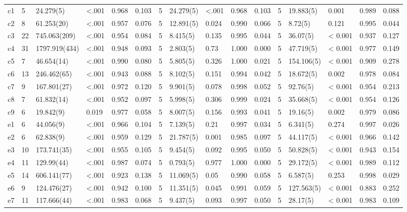 \documentclass[,man,floatsintext]{apa6}
\theoremstyle{definition}
\theoremstyle{definition}
\theoremstyle{definition}
\theoremstyle{remark}
\begin{document}
\begin{table}
{\begin{tabular}[t]{llllllllllllllll}
c1 & 5 & 24.279(5) & <.001 & 0.968 & 0.103 & 5 & 24.279(5) & <.001 & 0.968 & 0.103 & 5 & 19.883(5) & 0.001 & 0.989 & 0.088\\
c2 & 8 & 61.253(20) & <.001 & 0.957 & 0.076 & 5 & 12.891(5) & 0.024 & 0.990 & 0.066 & 5 & 8.72(5) & 0.121 & 0.995 & 0.044\\
c3 & 22 & 745.063(209) & <.001 & 0.954 & 0.084 & 5 & 8.415(5) & 0.135 & 0.995 & 0.044 & 5 & 36.07(5) & < 0.001 & 0.937 & 0.127\\
c4 & 31 & 1797.919(434) & <.001 & 0.948 & 0.093 & 5 & 2.803(5) & 0.73 & 1.000 & 0.000 & 5 & 47.719(5) & < 0.001 & 0.977 & 0.149\\
c5 & 7 & 46.654(14) & <.001 & 0.990 & 0.080 & 5 & 5.805(5) & 0.326 & 1.000 & 0.021 & 5 & 154.106(5) & < 0.001 & 0.909 & 0.278\\
c6 & 13 & 246.462(65) & <.001 & 0.943 & 0.088 & 5 & 8.102(5) & 0.151 & 0.994 & 0.042 & 5 & 18.672(5) & 0.002 & 0.978 & 0.084\\
c7 & 9 & 167.801(27) & <.001 & 0.972 & 0.120 & 5 & 9.901(5) & 0.078 & 0.998 & 0.052 & 5 & 92.76(5) & < 0.001 & 0.954 & 0.213\\
c8 & 7 & 61.832(14) & <.001 & 0.952 & 0.097 & 5 & 5.998(5) & 0.306 & 0.999 & 0.024 & 5 & 35.668(5) & < 0.001 & 0.954 & 0.126\\
c9 & 6 & 19.842(9) & 0.019 & 0.977 & 0.058 & 5 & 8.007(5) & 0.156 & 0.993 & 0.041 & 5 & 19.16(5) & 0.002 & 0.979 & 0.086\\
e1 & 6 & 44.056(9) & <.001 & 0.966 & 0.104 & 5 & 7.139(5) & 0.21 & 0.997 & 0.034 & 5 & 6.341(5) & 0.274 & 0.997 & 0.026\\
e2 & 6 & 62.838(9) & <.001 & 0.959 & 0.129 & 5 & 21.787(5) & 0.001 & 0.985 & 0.097 & 5 & 44.117(5) & < 0.001 & 0.966 & 0.142\\
e3 & 10 & 173.741(35) & <.001 & 0.955 & 0.105 & 5 & 9.454(5) & 0.092 & 0.995 & 0.050 & 5 & 50.828(5) & < 0.001 & 0.943 & 0.154\\
e4 & 11 & 129.99(44) & <.001 & 0.987 & 0.074 & 5 & 0.793(5) & 0.977 & 1.000 & 0.000 & 5 & 29.172(5) & < 0.001 & 0.989 & 0.112\\
e5 & 14 & 606.141(77) & <.001 & 0.923 & 0.138 & 5 & 11.069(5) & 0.05 & 0.990 & 0.058 & 5 & 6.587(5) & 0.253 & 0.998 & 0.029\\
e6 & 9 & 124.476(27) & <.001 & 0.942 & 0.100 & 5 & 11.351(5) & 0.045 & 0.991 & 0.059 & 5 & 127.563(5) & < 0.001 & 0.883 & 0.252\\
e7 & 11 & 117.666(44) & <.001 & 0.983 & 0.068 & 5 & 9.437(5) & 0.093 & 0.997 & 0.050 & 5 & 28.17(5) & < 0.001 & 0.983 & 0.109\\

\end{tabular}}
\end{table}
\end{document}
